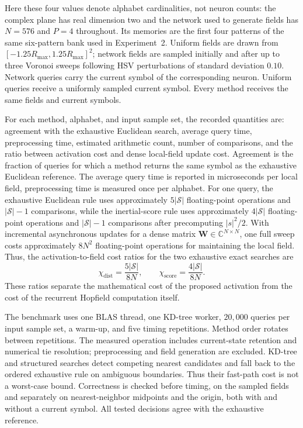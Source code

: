 \documentclass[10pt,journal,letterpaper]{IEEEtran}
\begin{document}
Here these four values denote alphabet cardinalities, not neuron counts:
the complex plane has real dimension two and the network used to generate
fields has $N=576$ and $P=4$ throughout. Its memories are the first four
patterns of the same six-pattern bank used in Experiment~2. Uniform fields
are drawn from $[-1.25R_{\max},1.25R_{\max}]^2$; network fields are sampled
initially and after up to three Voronoi sweeps following HSV perturbations
of standard deviation $0.10$. Network queries carry the current symbol of
the corresponding neuron. Uniform queries receive a uniformly sampled
current symbol. Every method receives the same fields and current symbols.

For each method, alphabet, and input sample set, the recorded quantities are:
agreement with the exhaustive Euclidean search, average query time,
preprocessing time, estimated arithmetic count, number of
comparisons, and the ratio between activation cost and dense local-field update
cost. Agreement is the fraction of queries for which a method returns the same
symbol as the exhaustive Euclidean reference. The average query time is
reported in microseconds per local field, preprocessing time is measured once
per alphabet. For one query, the exhaustive Euclidean
rule uses approximately $5|\mathcal{S}|$
floating-point operations and $|\mathcal{S}|-1$ comparisons, while the
inertial-score rule uses approximately $4|\mathcal{S}|$ floating-point
operations and $|\mathcal{S}|-1$ comparisons after precomputing
$|s|^2/2$. With incremental asynchronous updates for a dense matrix
$\boldsymbol{W}\in\mathbb{C}^{N\times N}$, one full sweep costs approximately
$8N^2$ floating-point operations for maintaining the local field. Thus, the
activation-to-field cost ratios for the two exhaustive exact searches are
\begin{equation}
    \chi_{\mathrm{dist}}
    =
    \frac{5|\mathcal{S}|}{8N},
    \qquad
    \chi_{\mathrm{score}}
    =
    \frac{4|\mathcal{S}|}{8N}.
\label{eq:activation_field_ratio}
\end{equation}
These ratios separate the mathematical cost of the proposed activation from
the cost of the recurrent Hopfield computation itself.

The benchmark uses one BLAS thread, one KD-tree worker, $20{,}000$ queries
per input sample set, a warm-up, and five timing repetitions. Method order
rotates between repetitions. The measured operation includes current-state
retention and numerical tie resolution; preprocessing and field generation
are excluded. KD-tree and structured searches detect competing nearest
candidates and fall back to the ordered exhaustive rule on ambiguous
boundaries. Thus their fast-path cost is not a worst-case bound.
Correctness is checked before timing, on the sampled fields and separately
on nearest-neighbor midpoints and the origin, both with and without a current
symbol. All tested decisions agree with the exhaustive reference.
\end{document}
